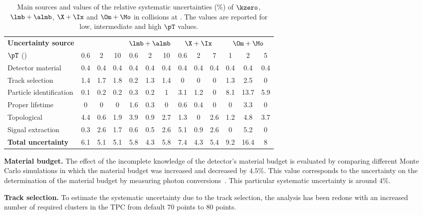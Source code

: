 \documentclass[ALICE,manyauthors]{cernphprep}
\begin{document}
\begin{table}[!ht]
	\begin{center}
		\caption{Main sources and values of the relative systematic uncertainties (\%) of $\kzero$, $\lmb + \almb$, $\X + \Ix$ and $\Om + \Mo$ in \pPb collisions at \fivenn.
			The values are reported for low, intermediate and high $\pT$ values.}
		\label{tab:pPbInclUncer}
		\begin{tabularx}{\textwidth}{@{} lCCCCCCCCCCCC @{}}
			\toprule
			\textbf{Uncertainty source} & 
			& 
			& 
			&  \\
			\cmidrule(lr){2-4} \cmidrule(lr){5-7} \cmidrule(lr){8-10} \cmidrule(lr){11-13}
			$\pT$ (\GeVc) & 0.6 & 2 &10  & 0.6 & 2 & 10    & 0.6 & 2 & 7   & 1& 2 & 5 \\
			\midrule
			Detector material& 0.4 & 0.4 & 0.4 & 0.4 & 0.4 & 0.4 & 0.4 & 0.4 & 0.4 & 0.4 & 0.4 & 0.4 \\
			Track selection & 1.4& 1.7& 1.8& 0.2& 1.3& 1.4& 0& 0& 0& 1.3& 2.5& 0\\
			Particle identification& 0.1& 0.2& 0.2& 0.3& 0.2& 1& 3.1&  1.2& 0& 8.1& 13.7& 5.9 \\
			Proper lifetime & 0& 0& 0& 1.6& 0.3& 0& 0.6& 0.4& 0& 0& 3.3& 0\\
			Topological & 4.4& 0.6& 1.9& 3.9& 0.9& 2.7& 1.3& 0& 2.6& 1.2& 4.8& 3.7\\
			Signal extraction& 0.3& 2.6& 1.7& 0.6& 0.5& 2.6& 5.1& 0.9& 2.6& 0& 5.2& 0\\
			\midrule
			\textbf{Total uncertainty}& 6.1& 5.1& 5.1& 5.8& 4.3& 5.8& 7.4& 4.3& 5.4& 9.2& 16.4& 8\\
			\bottomrule
		\end{tabularx}
	\end{center}
\end{table}

\textbf{Material budget.} The effect of the incomplete knowledge of the detector's material budget is evaluated by comparing different Monte Carlo simulations in which the material budget was increased and decreased by $4.5\%$.
This value corresponds to the uncertainty on the determination of the material budget by measuring photon conversions~.
This particular systematic uncertainty is around $4\%$.

\textbf{Track selection.} To estimate the systematic uncertainty due to the track selection, the analysis has been redone with an increased number of required clusters in the TPC from default 70 points to 80 points.
\end{document}

